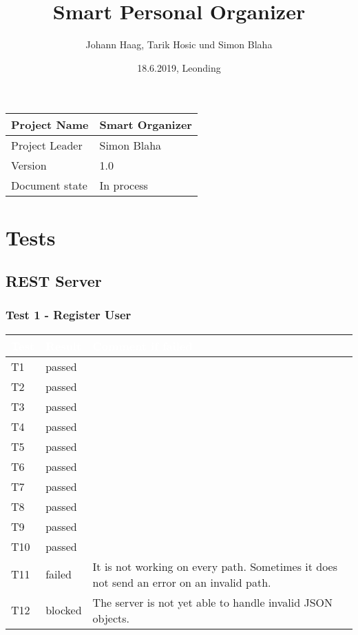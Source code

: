 \documentclass[12pt]{scrartcl}
\title{Smart Personal Organizer}
\author{Johann Haag, Tarik Hosic und Simon Blaha}
\date{18.6.2019, Leonding}
\begin{document}
    \maketitle
    \begin{flushleft}
    \begin{tabular}{|l|l|}
    \hline
    Project Name & Smart Organizer \\ \hline
    Project Leader & Simon Blaha \\ \hline
    Version & 1.0\\ \hline
    Document state & In process \\ \hline
    \end{tabular}
    \end{flushleft}

    \pagebreak
    \tableofcontents
    \pagebreak


    \section{Tests}                             
    \subsection{REST Server}
    \subsubsection{Test 1 - Register User}
        \begin{tabular}{|L{2cm}|L{1.2cm}|L{11cm}|} 
            \hline 
            \textcolor{white}{Test} & \textcolor{white}{Result} & \textcolor{white}{Comment if failed} \\ \hline
            T1 &  passed & \\  \hline
            T2 &  passed & \\  \hline
            T3 &  passed & \\  \hline
            T4 &  passed & \\  \hline
            T5 &  passed & \\  \hline
            T6 &  passed & \\  \hline
            T7 &  passed & \\  \hline
            T8 &  passed & \\  \hline
            T9 &  passed & \\  \hline
            T10 & passed & \\  \hline
            T11 & failed & It is not working on every path. Sometimes it does not send an error on an invalid path.\\  \hline
            T12 & blocked & The server is not yet able to handle invalid JSON objects.\\  \hline
        \end{tabular}
\end{document}
